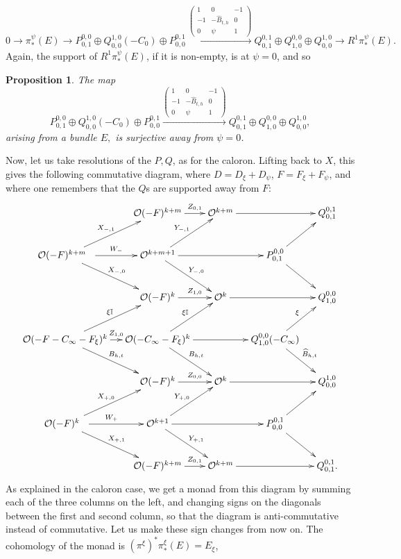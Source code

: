 \documentclass[12pt]{article}
\newtheorem{proposition}[theorem]{Proposition}
\theoremstyle{definition}
\theoremstyle{remark}
\numberwithin{theorem}{section}
\def\bI{{\mathbb {I}}}
\def\pO{{\mathcal O}}
\begin{document}
\begin{equation}\label{pushdownpsi}
\scriptstyle
0\rightarrow    \pi^\psi_* (E) \rightarrow  P_{0,1}^{0,0}\oplus Q^{1,0}_{0,0}(-C_0)\oplus P_{0,0}^{0,1}  \xrightarrow{\left(\begin{smallmatrix}1&0&-1\\-1&-\widehat B_{t,h}&0\\ 0&\psi&1\end{smallmatrix}\right)}  Q_{0,1}^{0,1}\oplus Q_{1,0}^{0,0}\oplus  Q_{0 ,0}^{ 1,0} \rightarrow R^1\pi^\psi_*(E).
\end{equation}
Again, the support of $R^1\pi^\psi_*(E)$, if it is non-empty, is at $\psi = 0$, and so
\begin{proposition} \label{gen2} The map 
$$  P_{0,1}^{0,0}\oplus Q^{1,0}_{0,0}(-C_0)\oplus P_{0,0}^{0,1}  \xrightarrow{\begin{pmatrix}1&0&-1\\-1&-\widehat B_{t,h}&0\\ 0&\psi&1\end{pmatrix}}  Q_{0,1}^{0,1}\oplus Q_{1,0}^{0,0}\oplus  Q_{0 ,0}^{ 1,0},$$
arising from a bundle $E,$ is surjective away from $\psi= 0$.
\end{proposition}

 
 
 
Now, let us take resolutions of the $P, Q$, as for the caloron. Lifting back to $X$, this gives the following commutative diagram, where $D= D_\xi+D_\psi$, $F = F_\xi + F_\psi$, and where one remembers that the $Q$s are supported away from $F$:
\begin{equation} \label{resolution-PQ-TN-4}
    \xymatrix@C=1pc{  
 & \pO(-F)^{k+m} \ar[r]^-{Z_{ 0,1} } &\pO^{k+m}\ar[rr]& &Q_{0,1}^{0,1}\\
 \pO(-F)^{k+m}\ \  \ar[dr]^{X_{-,0} }\ar[r]^-{W_{ -}}\ar[ur]^{X_{-,1} }& \pO^{k+m+1} \ar[dr]^{Y_{ -,0} }\ar[ur]^{Y_{ -,1} }\ar[rr]&&P_{0,1}^{0,0} \ar[ur]\ar[dr] \\ 
 &  \pO(-F)^{k } \ar[r]^-{Z_{ 1,0}} &\pO^{k}\ar[rr]& &Q_{ 1,0}^{0,0} \\ 
 \pO(-F-C_\infty-F_\xi)^{k}\ar[ur]^-{\xi\bI} \ar[dr]^{ B_{h,t}}\ar[r]^-{Z_{ 1,0}} &  \pO(-C_\infty-F_\xi)^{k}\ar[ur]^{\xi\bI}  \ar[rd]^{ B_{h,t}}\ar[rr] & &Q_{ 1,0}^{0,0}(-C_\infty) \ar[ur]^\xi  \ar[rd]^{ \widehat B_{h,t}} \\
 & \pO(-F)^{k }\ar[r]^-{Z_{0,0}} &\pO^{k} \ar[rr]& &Q_{0 ,0}^{ 1,0} \\
 \pO(-F)^{k }\ \ \ar[dr]^{X_{ +,1}  } \ar[r]^{W_{+}}\ar[ur]^{X_{+,0} }&   \pO^{k+1}\ar[dr]^{Y_{+,1}}\ar[ur]^{Y_{+,0}}\ar[rr]&   &P_{0,0}^{0,1}\ar[dr] \ar[ur]\\
 & \pO(-F)^{k+m} \ar[r]^-{Z_{ 0,1} } &\pO^{k+m}\ar[rr]& &Q_{0,1}^{0,1}.
   }
\end{equation}
As explained in the caloron case, we get a monad from this diagram by summing each of the three columns on the left, and changing signs on the diagonals between the first and second column, so that the diagram is anti-commutative instead of commutative. Let us make these sign changes from now on. The  cohomology of the monad is $(\pi^\xi)^*\pi^\xi_*(E)= E_\xi$,
\end{document}
